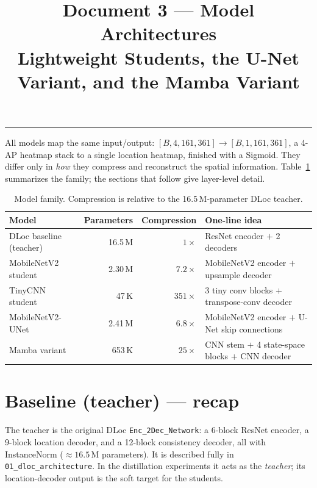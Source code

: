 \documentclass[11pt,a4paper]{article}
\title{\vspace{-1.5em}\textbf{Document 3 --- Model Architectures}\\
\large Lightweight Students, the U-Net Variant, and the Mamba Variant}
\author{}
\date{}
\newcommand{\code}[1]{\texttt{\small #1}}
\begin{document}
\maketitle
\tableofcontents
\vspace{1em}\hrule\vspace{1em}

All models map the same input/output: $[B,4,161,361]\!\to\![B,1,161,361]$, a 4-AP heatmap stack
to a single location heatmap, finished with a Sigmoid. They differ only in \emph{how} they
compress and reconstruct the spatial information. Table~\ref{tab:summary} summarizes the family;
the sections that follow give layer-level detail.

\begin{table}[h]
\centering
\caption{Model family. Compression is relative to the 16.5\,M-parameter DLoc teacher.}
\label{tab:summary}
\begin{tabular}{@{}lrrl@{}}
\toprule
Model & Parameters & Compression & One-line idea \\
\midrule
DLoc baseline (teacher) & 16.5\,M & $1\times$   & ResNet encoder $+$ 2 decoders \\
MobileNetV2 student     & 2.30\,M & $7.2\times$ & MobileNetV2 encoder $+$ upsample decoder \\
TinyCNN student         & 47\,K   & $351\times$ & 3 tiny conv blocks $+$ transpose-conv decoder \\
MobileNetV2-UNet        & 2.41\,M & $6.8\times$ & MobileNetV2 encoder $+$ U-Net skip connections \\
Mamba variant           & 653\,K  & $25\times$  & CNN stem $+$ 4 state-space blocks $+$ CNN decoder \\
\bottomrule
\end{tabular}
\end{table}

\section{Baseline (teacher) --- recap}

The teacher is the original DLoc \code{Enc\_2Dec\_Network}: a 6-block ResNet encoder, a 9-block
location decoder, and a 12-block consistency decoder, all with InstanceNorm
($\approx16.5$\,M parameters). It is described fully in \texttt{01\_dloc\_architecture}. In the
distillation experiments it acts as the \emph{teacher}; its location-decoder output is the soft
target for the students.
\end{document}
